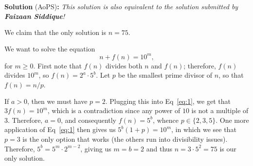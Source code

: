 
\begin{solution}
\textbf{Solution} (AoPS)\textbf{:}
\newline
\textit{This solution is also equivalent to the solution submitted by \textbf{Faizaan Siddique}!}\V

We claim that the only solution is $n=75$.\V

We want to solve the equation 
\begin{equation}\label{eq:1}
    n+f(n) = 10^m,
\end{equation}
for $m\geq 0$. First note that $f(n)$ divides both $n$ and $f(n)$; therefore, $f(n)$ divides $10^m$, so $f(n) = 2^a\cdot 5^b$. Let $p$ be the smallest prime divisor of $n$, so that $f(n) = n/p$. \V

If $a>0$, then we must have $p=2$. Plugging this into Eq~\ref{eq:1}, we get that $3f(n)=10^m$, which is a contradiction since any power of $10$ is not a multiple of $3$. Therefore, $a=0$, and consequently $f(n)=5^b$, whence $p\in \{2,3,5\}$. One more application of Eq~\ref{eq:1} then gives us $5^b(1+p) = 10^m$, in which we see that $p=3$ is the only option that works (the others run into divisibility issues). Therefore, $5^b = 5^m\cdot 2^{m-2}$, giving us $m=b=2$ and thus $n=3\cdot 5^2=75$ is our only solution.
\end{solution}\V
